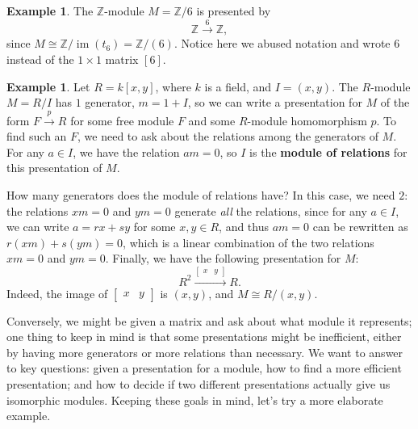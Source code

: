 \documentclass[12pt]{report}
\numberwithin{equation}{section}
\numberwithin{theorem}{chapter}
\theoremstyle{definition}
\newtheorem{example}[theorem]{Example}
\newtheorem*{basic properties}{Basic Properties}
\newtheorem*{Important Remark}{Important Remark}
\newcommand{\df}[1]{{\bf #1}\index{#1}}
\newcommand{\Z}{\mathbb{Z}}
\DeclareMathOperator{\im}{im}
\begin{document}
 
\begin{example}
	The $\Z$-module $M = \Z/6$ is presented by 
	$$\Z \xrightarrow{6} \Z,$$
	since $M \cong \Z/ \im(t_6) = \Z/(6)$. Notice here we abused notation and wrote $6$ instead of the $1 \times 1$ matrix $\left[ 6 \right]$.
\end{example}

\begin{example}
	Let $R = k[x,y]$, where $k$ is a field, and $I = (x,y)$. The $R$-module $M = R/I$ has $1$ generator, $m = 1+I$, so we can write a presentation for $M$ of the form $F \xrightarrow{p} R$ for some free module $F$ and some $R$-module homomorphism $p$. To find such an $F$, we need to ask about the relations among the generators of $M$. For any $a \in I$, we have the relation $am = 0$, so $I$ is the \df{module of relations} for this presentation of $M$. 
	
	How many generators does the module of relations have? In this case, we need $2$: the relations $xm = 0$ and $ym=0$ generate \emph{all} the relations, since for any $a \in I$, we can write $a = rx+sy$ for some $x, y \in R$, and thus $am = 0$ can be rewritten as $r(xm) + s(ym) = 0$, which is a linear combination of the two relations $xm=0$ and $ym=0$. Finally, we have the following presentation for $M$:
	$$R^2 \xrightarrow{\begin{bmatrix} x & y \end{bmatrix}} R.$$
	Indeed, the image of $\begin{bmatrix} x & y \end{bmatrix}$ is $(x,y)$, and $M \cong R/(x,y)$.
\end{example}


Conversely, we might be given a matrix and ask about what module it represents; one thing to keep in mind is that some presentations might be inefficient, either by having more generators or more relations than necessary. We want to answer to key questions: given a presentation for a module, how to find a more efficient presentation; and how to decide if two different presentations actually give us isomorphic modules. Keeping these goals in mind, let's try a more elaborate example.
 
\end{document}
